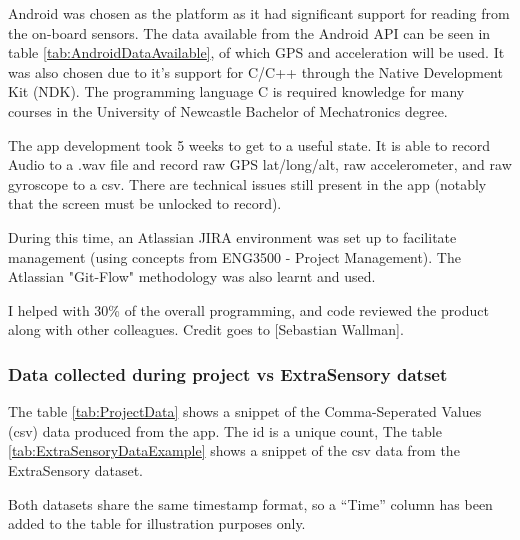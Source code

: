 \documentclass{UoNMCHA}
\newcommand{\citationneeded}{\textsuperscript{\color{blue} [citation needed]}}
\newcommand{\inlineQuote}[1]{``#1''}
\numberwithin{equation}{section}
\begin{document}
Android was chosen as the platform as it had significant support for reading from the on-board sensors. The data available from the Android API can be seen in table \ref{tab:AndroidDataAvailable}, of which GPS and acceleration will be used. It was also chosen due to it's support for C/C++ through the Native Development Kit (NDK). The programming language C is required knowledge for many courses in the University of Newcastle Bachelor of Mechatronics degree. 

The app development took 5 weeks to get to a useful state. It is able to record Audio to a .wav file and record raw GPS lat/long/alt, raw accelerometer, and raw gyroscope to a csv. There are technical issues still present in the app (notably that the screen must be unlocked to record).

During this time, an Atlassian JIRA environment was set up to facilitate management (using concepts from ENG3500 - Project Management). The Atlassian "Git-Flow" methodology was also learnt and used.

I helped with 30\% of the overall programming, and code reviewed the product along with other colleagues. Credit goes to [Sebastian Wallman].

\subsubsection{Data collected during project vs ExtraSensory datset}
The table \ref{tab:ProjectData} shows a snippet of the Comma-Seperated Values (csv) data produced from the app. The id is a unique count, %
The table \ref{tab:ExtraSensoryDataExample} shows a snippet of the csv data from the ExtraSensory dataset. 

Both datasets share the same timestamp format, so a \inlineQuote{Time} column has been added to the table for illustration purposes only.

 
\end{document}
